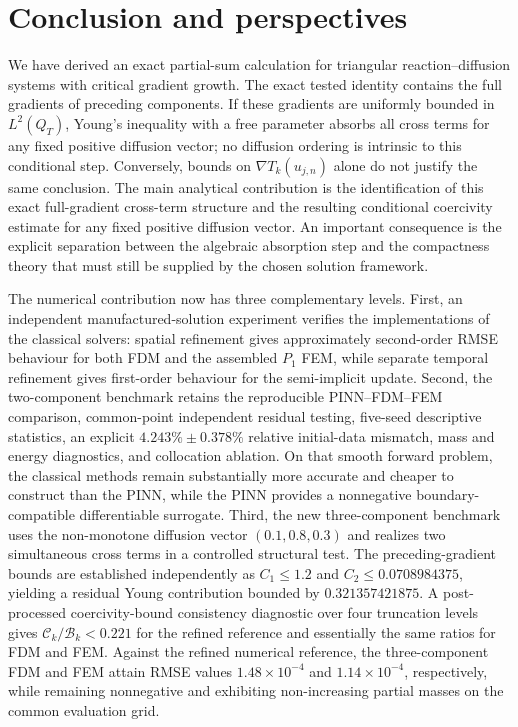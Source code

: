 \section{Conclusion and perspectives}
\label{sec:conclusion}

We have derived an exact partial-sum calculation for triangular reaction--diffusion systems with critical gradient growth. The exact tested identity contains the full gradients of preceding components. If these gradients are uniformly bounded in $L^2(Q_T)$, Young's inequality with a free parameter absorbs all cross terms for any fixed positive diffusion vector; no diffusion ordering is intrinsic to this conditional step. Conversely, bounds on $\nabla T_k(u_{j,n})$ alone do not justify the same conclusion. The main analytical contribution is the identification of this exact full-gradient cross-term structure and the resulting conditional coercivity estimate for any fixed positive diffusion vector. An important consequence is the explicit separation between the algebraic absorption step and the compactness theory that must still be supplied by the chosen solution framework.

The numerical contribution now has three complementary levels. First, an independent manufactured-solution experiment verifies the implementations of the classical solvers: spatial refinement gives approximately second-order RMSE behaviour for both FDM and the assembled $P_1$ FEM, while separate temporal refinement gives first-order behaviour for the semi-implicit update. Second, the two-component benchmark retains the reproducible PINN--FDM--FEM comparison, common-point independent residual testing, five-seed descriptive statistics, an explicit $4.243\%\pm0.378\%$ relative initial-data mismatch, mass and energy diagnostics, and collocation ablation. On that smooth forward problem, the classical methods remain substantially more accurate and cheaper to construct than the PINN, while the PINN provides a nonnegative boundary-compatible differentiable surrogate. Third, the new three-component benchmark uses the non-monotone diffusion vector $(0.1,0.8,0.3)$ and realizes two simultaneous cross terms in a controlled structural test. The preceding-gradient bounds are established independently as $C_1\le1.2$ and $C_2\le0.0708984375$, yielding a residual Young contribution bounded by $0.321357421875$. A post-processed coercivity-bound consistency diagnostic over four truncation levels gives $\mathcal C_k/\mathcal B_k<0.221$ for the refined reference and essentially the same ratios for FDM and FEM. Against the refined numerical reference, the three-component FDM and FEM attain RMSE values $1.48\times10^{-4}$ and $1.14\times10^{-4}$, respectively, while remaining nonnegative and exhibiting non-increasing partial masses on the common evaluation grid.

